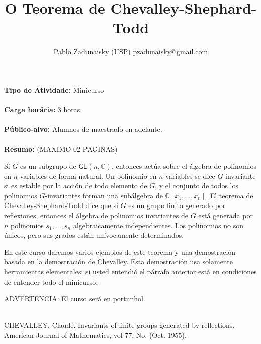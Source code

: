 \documentclass{amsart}
\title{ \header  O Teorema de Chevalley-Shephard-Todd}
\author{Pablo Zadunaisky (USP) {\rm pzadunaisky@gmail.com}  \\
}
\theoremstyle{plain}
\begin{document}
\maketitle
\textbf{Tipo de Atividade:} Minicurso\\\\
\textbf{Carga hor\'aria:} 3 horas.\\\\
\textbf{P\'ublico-alvo:} Alumnos de maestrado en adelante.\\\\
\textbf{Resumo:} (MAXIMO 02 PAGINAS) 

Si $G$ es un subgrupo de $\mathsf{GL}(n, \mathbb C)$, entonces actúa sobre el
álgebra de polinomios en $n$ variables de forma natural. Un polinomio en $n$
variables se dice $G$-invariante si es estable por la acción de todo elemento
de $G$, y el conjunto de todos los polinomios $G$-invariantes forman una 
subálgebra de $\mathbb C[x_1, \ldots, x_n]$. 
El teorema de Chevalley-Shephard-Todd dice que si $G$ es un grupo finito
generado por reflexiones, entonces el álgebra de polinomios invariantes de 
$G$ está generada por $n$ polinomios $s_1, \ldots, s_n$ algebraicamente 
independientes. Los polinomios no son únicos, pero sus grados están 
unívocamente determinados. 

En este curso daremos varios ejemplos de este teorema y una demostración 
basada en la demostración de Chevalley. Esta demostración usa solamente 
herramientas elementales: si usted entendió el párrafo anterior está en
condiciones de entender todo el minicurso.

ADVERTENCIA: El curso será en portunhol.
\\\\
\begin{thebibliography}{99}
 CHEVALLEY, Claude. Invariants of finite groups generated by
reflections. American Journal of Mathematics, vol 77, No. (Oct. 1955).
\end{thebibliography}
\end{document}
